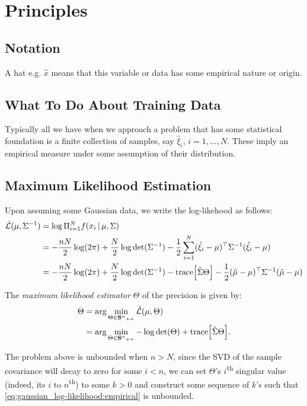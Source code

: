 \chapter{Principles}

\section{Notation}

A hat e.g. $\hat{x}$ means that this variable or data has some 
empirical nature or origin.

\section{What To Do About Training Data}

Typically all we have when we approach a problem that has some
statistical foundation is a finite collection of samples, say
$\hat{\xi}_i$, $i=1,\ldots,N$. These imply an empirical measure under some
assumption of their distribution.

\section{Maximum Likelihood Estimation}

Upon assuming some Gaussian data, we write the log-likehood
as follows:
\begin{align}
\hat{\mathcal{L}}(\mu, \Sigma^{-1}) & = \log\Pi_{i=1}^N f(x_i\,|\, \mu, \Sigma)\\
& = -\frac{nN}{2}\log(2\pi)
+ \frac N2\log\det(\Sigma^{-1}) - \frac 12 \sum_{i=1}^N (\hat{\xi}_i - \mu)^\top\Sigma^{-1} (\hat{\xi}_i - \mu)\nonumber\\
& = -\frac{nN}{2}\log(2\pi)
+ \frac N2\log\det(\Sigma^{-1})
- \textnormal{trace}\Big[ \hat{\Sigma}\Theta \Big] -      
\frac 12  (\hat{\mu} - \mu)^\top\Sigma^{-1} (\hat{\mu} - \mu)
\label{eq:gaussian_log-likelihood}
\end{align}

The \emph{maximum likelihood estimator} $\Theta$ of the precision 
is given by:
\begin{align}
\Theta & = \arg\min_{\Theta\in{{\mathbf{S}^n}_{++}}} \hat{\mathcal{L}}(\mu, \Theta)\nonumber\\
 & = \arg\min_{\Theta\in{{\mathbf{S}^n}_{++}}} -\log\det(\Theta)
 + \textnormal{trace}\Big[ \hat{\Sigma} \Theta \Big].\label{eq:gaussian_log-likelihood:empirical}
\end{align}

The problem above is unbounded when $n>N$, since the SVD of the
sample covariance will decay to zero for some $i<n$, we can set
$\Theta$'s $i$\textsuperscript{th} singular value (indeed, its $i$ 
to $n$\textsuperscript{th}) to some $k>0$ and construct some
sequence of $k$'s such that 
\eqref{eq:gaussian_log-likelihood:empirical} is unbounded.
